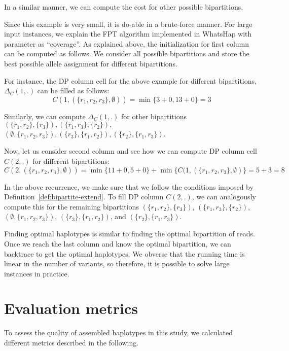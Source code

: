 In a similar manner, we can compute the cost for other possible bipartitions.

Since this example is very small, it is do-able in a brute-force manner. For large input instances, we explain the FPT algorithm implemented in WhatsHap with parameter as ``coverage''.
As explained above, the initialization for first column can be computed as follows. We consider all possible bipartitions and store the best possible allele assignment for different bipartitions.

For instance, the DP column cell for the above example for different bipartitions, $\Delta_C(1,.)$ can be filled as follows:
\[C(1, (\{r_1,r_2,r_3\},\emptyset)) =\min\{3+0,13+0\} = 3\]

Similarly, we can compute $\Delta_C(1,.)$ for other bipartitions $(\{r_1,r_2\},\{r_3\}),(\{r_1,r_3\},\{r_2\}),$\\
$(\emptyset,\{r_1,r_2,r_3\}), (\{r_3\},\{r_1,r_2\}), (\{r_2\},\{r_1,r_3\})$.

Now, let us consider second column and see how we can compute DP column cell $C(2,.)$ for different bipartitions:
\[C(2, (\{r_1,r_2,r_3\},\emptyset)) = \min\{11+0, 5+0\}  + \min\{C(1, (\{r_1,r_2,r_3\},\emptyset)\} = 5+3 = 8 \]

In the above recurrence, we make sure that we follow the conditions imposed by Definition~\ref{def:bipartite-extend}.
To fill DP column $C(2,.)$, we can analogously compute this for the remaining bipartitions $(\{r_1,r_2\},\{r_3\})$,
$(\{r_1,r_3\},\{r_2\})$, $(\emptyset,\{r_1,r_2,r_3\})$, $(\{r_3\},\{r_1,r_2\})$, and $(\{r_2\},\{r_1,r_3\})$.

Finding optimal haplotypes is similar to finding the optimal bipartition of reads. Once we reach the last column and know the optimal bipartition, we can backtrace to get the optimal haplotypes.
We obverse that the running time is linear in the number of variants, so therefore, it is possible to solve large instances in practice.

\section{Evaluation metrics}
To assess the quality of assembled haplotypes in this study, we calculated different metrics described in the following.

